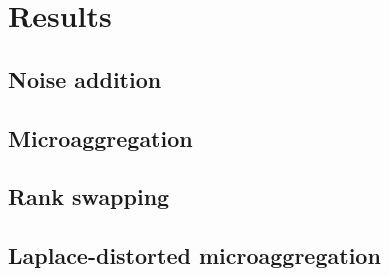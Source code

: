 \section{Results}
\label{Benchmarking:Results}

\subsection{Noise addition}
\label{Benchmarking:Results:Noise}

\subsection{Microaggregation}
\label{Benchmarking:Results:MicroAgg}

\subsection{Rank swapping}
\label{Benchmarking:Results:RankSwap}

\subsection{Laplace-distorted microaggregation}
\label{Benchmarking:Results:DiffPriv}